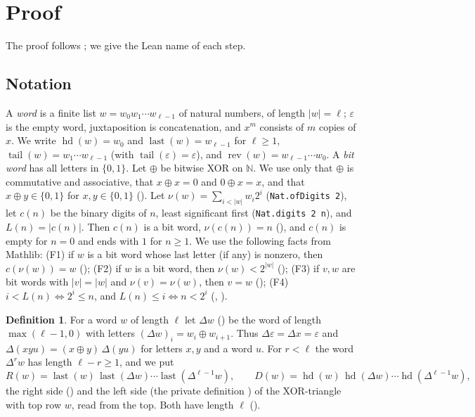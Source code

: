 \documentclass[11pt]{amsart}
\theoremstyle{plain}
\theoremstyle{definition}
\newtheorem{definition}[theorem]{Definition}
\newcommand{\N}{\mathbb{N}}
\newcommand{\rev}{\operatorname{rev}}
\newcommand{\hd}{\operatorname{hd}}
\newcommand{\lst}{\operatorname{last}}
\newcommand{\tl}{\operatorname{tail}}
\newcommand{\len}[1]{\lvert #1\rvert}
\begin{document}
\section{Proof}\label{sec:proof}

The proof follows ; we give the Lean name of each step.

\subsection*{Notation}
A \emph{word} is a finite list $w=w_0w_1\cdots w_{\ell-1}$ of natural numbers, of length $\len w=\ell$; $\varepsilon$ is the empty word, juxtaposition is concatenation, and $x^m$ consists of $m$ copies of $x$. We write $\hd(w)=w_0$ and $\lst(w)=w_{\ell-1}$ for $\ell\ge1$, $\tl(w)=w_1\cdots w_{\ell-1}$ (with $\tl(\varepsilon)=\varepsilon$), and $\rev(w)=w_{\ell-1}\cdots w_0$. A \emph{bit word} has all letters in $\{0,1\}$.
Let $\oplus$ be bitwise XOR on $\N$. We use only that $\oplus$ is commutative and associative, that $x\oplus x=0$ and $0\oplus x=x$, and that $x\oplus y\in\{0,1\}$ for $x,y\in\{0,1\}$ ().
Let $\nu(w)=\sum_{i<\len w}w_i2^i$ (\texttt{Nat.ofDigits 2}), let $c(n)$ be the binary digits of $n$, least significant first (\texttt{Nat.digits 2 n}), and $L(n)=\len{c(n)}$. Then $c(n)$ is a bit word, $\nu(c(n))=n$ (), and $c(n)$ is empty for $n=0$ and ends with $1$ for $n\ge1$. We use the following facts from Mathlib:
(F1) if $w$ is a bit word whose last letter (if any) is nonzero, then $c(\nu(w))=w$ ();
(F2) if $w$ is a bit word, then $\nu(w)<2^{\len w}$ ();
(F3) if $v,w$ are bit words with $\len v=\len w$ and $\nu(v)=\nu(w)$, then $v=w$ ();
(F4) $i<L(n)\iff 2^i\le n$, and $L(n)\le i\iff n<2^i$ (, ).

\begin{definition}\label{def:ops}
For a word $w$ of length $\ell$ let $\Delta w$ () be the word of length $\max(\ell-1,0)$ with letters $(\Delta w)_i=w_i\oplus w_{i+1}$. Thus $\Delta\varepsilon=\Delta x=\varepsilon$ and $\Delta(xyu)=(x\oplus y)\,\Delta(yu)$ for letters $x,y$ and a word $u$. For $r<\ell$ the word $\Delta^rw$ has length $\ell-r\ge1$, and we put
\[
  R(w)=\lst(w)\,\lst(\Delta w)\cdots\lst(\Delta^{\ell-1}w),\qquad
  D(w)=\hd(w)\,\hd(\Delta w)\cdots\hd(\Delta^{\ell-1}w),
\]
the right side () and the left side (the private definition ) of the XOR-triangle with top row $w$, read from the top. Both have length $\ell$ ().
\end{definition}
\end{document}
